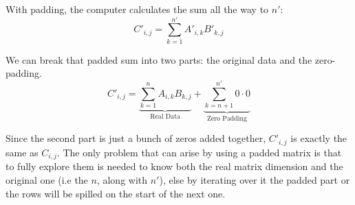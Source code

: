 \begin{appendices}
With padding, the computer calculates the sum all the way to $n'$:
\[ C'_{i,j} = \sum_{k=1}^{n'} A'_{i,k} B'_{k,j} \]

We can break that padded sum into two parts: the original data and the zero-padding.
\[ C'_{i,j} = \underbrace{\sum_{k=1}^{n} A_{i,k} B_{k,j}}_{\text{Real Data}} + \underbrace{\sum_{k=n+1}^{n'} 0 \cdot 0}_{\text{Zero Padding}} \]

Since the second part is just a bunch of zeros added together, $C'_{i,j}$ is exactly the same as $C_{i,j}$.
The only problem that can arise by using a padded matrix is that to fully explore them is needed to know both the real matrix dimension and the original one (i.e the $n$, along with $n'$), else by iterating over it the padded part or the rows will be spilled on the start of the next one.

\end{appendices}